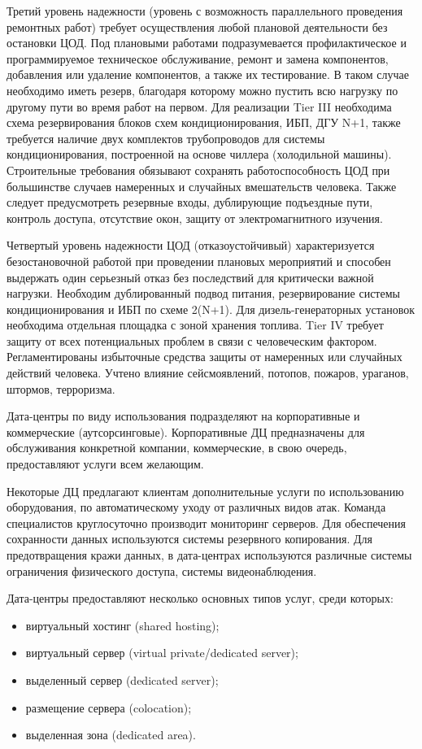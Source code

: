 Третий уровень надежности (уровень с возможность параллельного проведения ремонтных работ) требует осуществления любой плановой деятельности без остановки ЦОД.
Под плановыми работами подразумевается профилактическое и программируемое техническое обслуживание, ремонт и замена компонентов, добавления или удаление компонентов, а также их тестирование.
В таком случае необходимо иметь резерв, благодаря которому можно пустить всю нагрузку по другому пути во время работ на первом.
Для реализации Tier III необходима схема резервирования блоков схем кондиционирования, ИБП, ДГУ N+1, также требуется наличие двух комплектов трубопроводов для системы кондиционирования, построенной на основе чиллера (холодильной машины).
Строительные требования обязывают сохранять работоспособность ЦОД при большинстве случаев намеренных и случайных вмешательств человека.
Также следует предусмотреть резервные входы, дублирующие подъездные пути, контроль доступа, отсутствие окон, защиту от электромагнитного изучения.

Четвертый уровень надежности ЦОД (отказоустойчивый) характеризуется безостановочной работой при проведении плановых мероприятий и способен выдержать один серьезный отказ без последствий для критически важной нагрузки.
Необходим дублированный подвод питания, резервирование системы кондиционирования и ИБП по схеме 2(N+1).
Для дизель-генераторных установок необходима отдельная площадка с зоной хранения топлива.
Tier IV требует защиту от всех потенциальных проблем в связи с человеческим фактором.
Регламентированы избыточные средства защиты от намеренных или случайных действий человека.
Учтено влияние сейсмоявлений, потопов, пожаров, ураганов, штормов, терроризма.

Дата-центры по виду использования подразделяют на корпоративные и коммерческие (аутсорсинговые).
Корпоративные ДЦ предназначены для обслуживания конкретной компании, коммерческие, в свою очередь, предоставляют услуги всем желающим.

Некоторые ДЦ предлагают клиентам дополнительные услуги по использованию оборудования, по автоматическому уходу от различных видов атак.
Команда специалистов круглосуточно производит мониторинг серверов.
Для обеспечения сохранности данных используются системы резервного копирования.
Для предотвращения кражи данных, в дата-центрах используются различные системы ограничения физического доступа, системы видеонаблюдения.

Дата-центры предоставляют несколько основных типов услуг, среди которых:
\begin{itemize}
  \item виртуальный хостинг (shared hosting);
  \item виртуальный сервер (virtual private/dedicated server);
  \item выделенный сервер (dedicated server);
  \item размещение сервера (colocation);
  \item выделенная зона (dedicated area).
\end{itemize}

